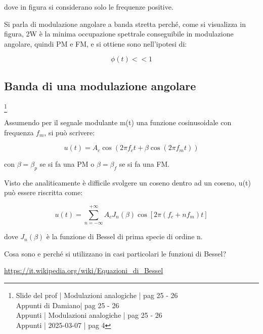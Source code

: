 dove in figura si considerano solo le frequenze positive. \newline 

Si parla di modulazione angolare a banda stretta perché, come si visualizza in figura, 2W è la minima occupazione 
spettrale conseguibile in modulazione angolare, quindi PM e FM, e si ottiene sono nell'ipotesi di: 

{
    \Large 
    \begin{equation}
        \phi (t) << 1
    \end{equation}
}

\newpage 

\subsection{Banda di una modulazione angolare}
\footnote{Slide del prof | Modulazioni analogiche | pag 25 - 26\\  
Appunti di Damiano| pag 25 - 26\\
Appunti | Modulazioni analogiche | pag 25 - 26\\
Appunti | 2025-03-07 | pag 4
} 

Assumendo per il segnale modulante m(t) una funzione cosinusoidale con frequenza $f_m$, 
si può scrivere: 

{
    \Large 
    \begin{equation}
        u(t) 
        = 
        A_c 
        \cos(2 \pi f_c t + \beta \cos(2 \pi f_m t))
    \end{equation}
}

con $\beta = \beta_p$ se si fa una PM o $\beta = \beta_f$ se si fa una FM. \newline 

Visto che analiticamente è difficile svolgere un coseno dentro ad un coseno, 
u(t) può essere riscritta come: 

{
    \Large 
    \begin{equation}
        u(t)
        = 
        \sum_{n = -\infty}^{+ \infty}
        A_c 
        J_n (\beta) \cos \left[ 2 \pi (f_c + n f_m) t\right]
    \end{equation}
}

dove $J_n (\beta)$ è la funzione di Bessel di prima specie di ordine n. \newline 

\begin{tcolorbox}
    Cosa sono e perché si utilizzano in casi particolari le funzioni di Bessel? \newline 

    \url{https://it.wikipedia.org/wiki/Equazioni_di_Bessel}
\end{tcolorbox}

